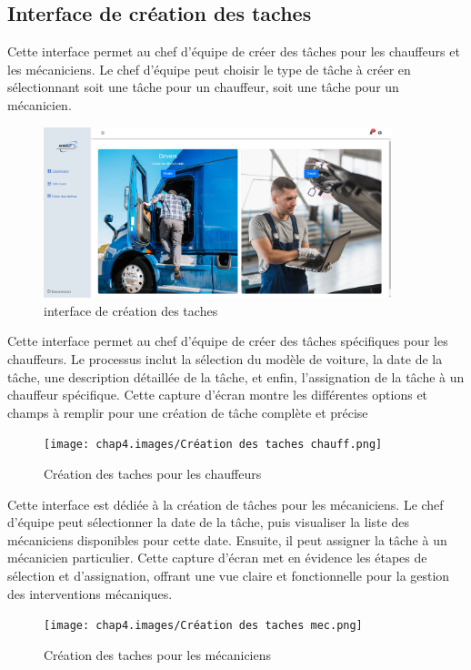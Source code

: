 
\subsection{Interface de création des taches}

Cette interface permet au chef d'équipe de créer des tâches pour les chauffeurs et les mécaniciens. Le chef d'équipe peut choisir le type de tâche à créer en sélectionnant soit une tâche pour un chauffeur, soit une tâche pour un mécanicien.
\bigskip
\begin{figure}[h!]
  \centering
  \includegraphics[width=0.9\textwidth]{chap4.images/creer taches.png}
  \caption{interface de création des taches}

\end{figure}


\newpage
Cette interface permet au chef d'équipe de créer des tâches spécifiques pour les chauffeurs. Le processus inclut la sélection du modèle de voiture, la date de la tâche, une description détaillée de la tâche, et enfin, l'assignation de la tâche à un chauffeur spécifique. Cette capture d'écran montre les différentes options et champs à remplir pour une création de tâche complète et précise

\begin{figure}[h!]
  \centering
  \texttt{[image: chap4.images/Création des taches chauff.png]}
  \caption{Création des taches pour les chauffeurs}

\end{figure}
\bigskip
Cette interface est dédiée à la création de tâches pour les mécaniciens. Le chef d'équipe peut sélectionner la date de la tâche, puis visualiser la liste des mécaniciens disponibles pour cette date. Ensuite, il peut assigner la tâche à un mécanicien particulier. Cette capture d'écran met en évidence les étapes de sélection et d'assignation, offrant une vue claire et fonctionnelle pour la gestion des interventions mécaniques.
\begin{figure}[h!]
  \centering
  \texttt{[image: chap4.images/Création des taches mec.png]}
  \caption{Création des taches pour les mécaniciens}

\end{figure}
\newpage
